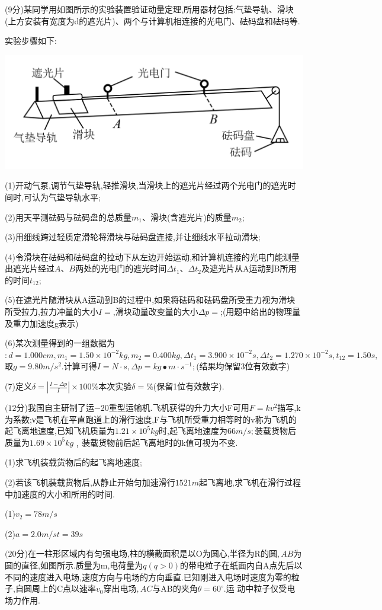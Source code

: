 \newpage
\question[6] (9分)某同学用如图所示的实验装置验证动量定理,所用器材包括:气垫导轨、滑块(上方安装有宽度为d的遮光片)、两个与计算机相连接的光电门、砝码盘和砝码等.

实验步骤如下:
\begin{center}
    \includegraphics[]{img/image12.png}
\end{center}
(1)开动气泵,调节气垫导轨,轻推滑块,当滑块上的遮光片经过两个光电门的遮光时间时,可认为气垫导轨水平;

(2)用天平测砝码与砝码盘的总质量$m_1$、滑块(含遮光片)的质量$m_2$;

(3)用细线跨过轻质定滑轮将滑块与砝码盘连接,并让细线水平拉动滑块;

(4)令滑块在砝码和砝码盘的拉动下从左边开始运动,和计算机连接的光电门能测量出遮光片经过$A$、$B$两处的光电门的遮光时间$Δt_1$、$Δt_2$及遮光片从A运动到B所用的时间$t_{12}$;

(5)在遮光片随滑块从A运动到B的过程中,如果将砝码和砝码盘所受重力视为滑块所受拉力,拉力冲量的大小$I=$,滑块动量改变量的大小$Δp=$;(用题中给出的物理量及重力加速度g表示)

(6)某次测量得到的一组数据为$:d=1.000cm,m_1=1.50×10^{-2}kg,m_2=0.400kg,Δt_1=3.900×10^{-2}s,Δt_2=1.270×10^{-2}s,t_{12}=1.50s,$取$g=9.80m/s^2.$计算可得$I=$$N·s,Δp=$$kg∙m·s^{-1};$(结果均保留3位有效数字)

(7)定义$\delta=|\frac{I-\Delta p}{I}|\times 100\%$本次实验$δ=$\%(保留1位有效数字).


\question[6] $(12$分)我国自主研制了运$-20$重型运输机.飞机获得的升力大小F可用$F=kv^2$描写,k为系数;ν是飞机在平直跑道上的滑行速度,F与飞机所受重力相等时的v称为飞机的起飞离地速度,已知飞机质量为$1.21×10^5kg$时,起飞离地速度为$66m/s;$装载货物后质量为$1.69×10^5kg﹐$装载货物前后起飞离地时的k值可视为不变.

(1)求飞机装载货物后的起飞离地速度;

(2)若该飞机装载货物后,从静止开始匀加速滑行$1521m$起飞离地,求飞机在滑行过程中加速度的大小和所用的时间.
\begin{solution}{4cm}
(1)$v_2=78m/s$

(2)$a=2.0m/s$\quad $t=39s$
\end{solution}
\newpage
\question[6] $(20$分)在一柱形区域内有匀强电场,柱的横截面积是以O为圆心,半径为R的圆$,AB$为圆的直径,如图所示.质量为m,电荷量为$q(q>0)$的带电粒子在纸面内自A点先后以不同的速度进入电场,速度方向与电场的方向垂直.已知刚进入电场时速度为零的粒子,自圆周上的C点以速率$v_0$穿出电场$,AC$与AB的夹角$θ=60^∘.$运    动中粒子仅受电场力作用.

